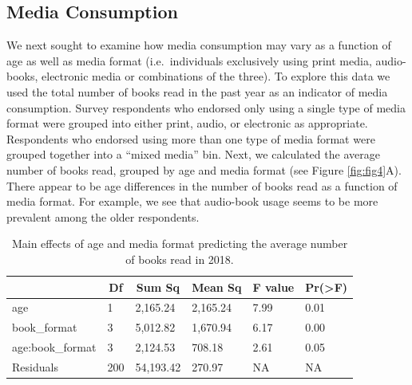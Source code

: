 \documentclass[man, fleqn, noextraspace]{apa6}
\theoremstyle{definition}
\theoremstyle{definition}
\theoremstyle{definition}
\theoremstyle{remark}
\begin{document}
\subsection{Media Consumption}\label{media-consumption}

We next sought to examine how media consumption may vary as a function
of age as well as media format (i.e.~individuals exclusively using print
media, audio-books, electronic media or combinations of the three). To
explore this data we used the total number of books read in the past
year as an indicator of media consumption. Survey respondents who
endorsed only using a single type of media format were grouped into
either print, audio, or electronic as appropriate. Respondents who
endorsed using more than one type of media format were grouped together
into a \enquote{mixed media} bin. Next, we calculated the average number
of books read, grouped by age and media format (see Figure
\ref{fig:fig4}A). There appear to be age differences in the number of
books read as a function of media format. For example, we see that
audio-book usage seems to be more prevalent among the older respondents.

\begin{table}[tbp]
\begin{center}
\begin{threeparttable}
\caption{\label{tab:tab2}Main effects of age and media format predicting the average number of books read in 2018.}
\begin{tabular}{llllll}
\toprule
 & \multicolumn{1}{c}{Df} & \multicolumn{1}{c}{Sum Sq} & \multicolumn{1}{c}{Mean Sq} & \multicolumn{1}{c}{F value} & \multicolumn{1}{c}{Pr(>F)}\\
\midrule
age & 1 & 2,165.24 & 2,165.24 & 7.99 & 0.01\\
book\_format & 3 & 5,012.82 & 1,670.94 & 6.17 & 0.00\\
age:book\_format & 3 & 2,124.53 & 708.18 & 2.61 & 0.05\\
Residuals & 200 & 54,193.42 & 270.97 & NA & NA\\
\bottomrule
\end{tabular}
\end{threeparttable}
\end{center}
\end{table}
\end{document}
